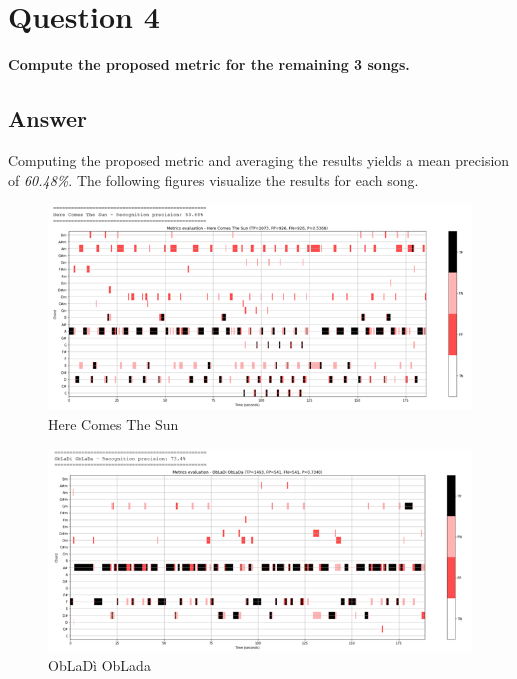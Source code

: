 \documentclass[
	12pt, %
]{fphw}
\begin{document}
{%

\section*{\color{red}Question 4}

\begin{problem}
	\textbf{Compute the proposed metric for the remaining 3 songs.}
\end{problem}

\subsection*{\color{blue}Answer}

Computing the proposed metric and averaging the results yields a mean precision of \emph{60.48\%}. The following figures visualize the results for each song.

\begin{figure}[H]
 \centering
 \includegraphics[scale=1]{./images/4_here_comes_the_sun_metrics.png}
 \caption{Here Comes The Sun}
\end{figure}

\begin{figure}[H]
 \centering
 \includegraphics[scale=1]{./images/4_obladi_oblada_metrics.png}
 \caption{ObLaDì ObLada}
\end{figure}

}
\end{document}

